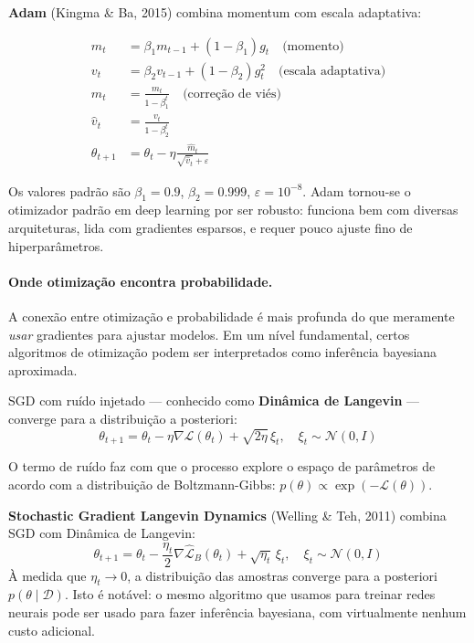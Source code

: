 \documentclass{tufte-handout}
\begin{document}
\begin{defn}[Adam]
    \textbf{Adam} (Kingma \& Ba, 2015) combina momentum com escala adaptativa:

    \begin{align*}
        m_t &= \beta_1 m_{t-1} + (1 - \beta_1) g_t \quad \text{(momento)} \\
        v_t &= \beta_2 v_{t-1} + (1 - \beta_2) g_t^2 \quad \text{(escala adaptativa)} \\
        \hat{m}_t &= \frac{m_t}{1 - \beta_1^t} \quad \text{(correção de viés)} \\
        \hat{v}_t &= \frac{v_t}{1 - \beta_2^t} \\
        \theta_{t+1} &= \theta_t - \eta \frac{\hat{m}_t}{\sqrt{\hat{v}_t} + \varepsilon}
    \end{align*}

    Os valores padrão são $\beta_1 = 0.9$, $\beta_2 = 0.999$, $\varepsilon = 10^{-8}$.
    Adam tornou-se o otimizador padrão em deep learning por ser robusto: funciona
    bem com diversas arquiteturas, lida com gradientes esparsos, e requer pouco
    ajuste fino de hiperparâmetros.
\end{defn}

\paragraph{Onde otimização encontra probabilidade.}

A conexão entre otimização e probabilidade é mais profunda do que meramente
\textit{usar} gradientes para ajustar modelos. Em um nível fundamental, certos
algoritmos de otimização podem ser interpretados como inferência bayesiana
aproximada.

SGD com ruído injetado --- conhecido como \textbf{Dinâmica de Langevin}
--- converge para a distribuição a posteriori:
\[
\theta_{t+1} = \theta_t - \eta \nabla \mathcal{L}(\theta_t) + \sqrt{2\eta} \, \xi_t,
\quad \xi_t \sim \mathcal{N}(0, I)
\]

O termo de ruído faz com que o processo explore o espaço de parâmetros de acordo
com a distribuição de Boltzmann-Gibbs: $p(\theta) \propto \exp(-\mathcal{L}(\theta))$.

\begin{defn}[SGLD]
    \textbf{Stochastic Gradient Langevin Dynamics} (Welling \& Teh, 2011) combina SGD
    com Dinâmica de Langevin:
    \[
    \theta_{t+1} = \theta_t - \frac{\eta_t}{2} \nabla \hat{\mathcal{L}}_B(\theta_t)
    + \sqrt{\eta_t} \, \xi_t, \quad \xi_t \sim \mathcal{N}(0, I)
    \]
    À medida que $\eta_t \to 0$, a distribuição das amostras converge para a
    posteriori $p(\theta \mid \mathcal{D})$. Isto é notável: o mesmo algoritmo que
    usamos para treinar redes neurais pode ser usado para fazer inferência bayesiana,
    com virtualmente nenhum custo adicional.
\end{defn}
\end{document}

